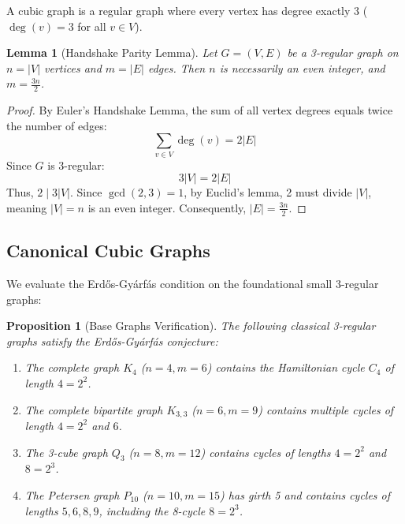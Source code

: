 \documentclass[11pt,a4paper]{article}
\newtheorem{lemma}[theorem]{Lemma}
\newtheorem{proposition}[theorem]{Proposition}
\theoremstyle{definition}
\begin{document}
A cubic graph is a regular graph where every vertex has degree exactly 3 ($\deg(v) = 3$ for all $v \in V$).

\begin{lemma}[Handshake Parity Lemma]\label{lem:handshake}
Let $G = (V, E)$ be a 3-regular graph on $n = |V|$ vertices and $m = |E|$ edges. Then $n$ is necessarily an even integer, and $m = \frac{3n}{2}$.
\end{lemma}

\begin{proof}
By Euler's Handshake Lemma, the sum of all vertex degrees equals twice the number of edges:
\[ \sum_{v \in V} \deg(v) = 2 |E| \]
Since $G$ is 3-regular:
\[ 3 |V| = 2 |E| \]
Thus, $2 \mid 3 |V|$. Since $\gcd(2, 3) = 1$, by Euclid's lemma, 2 must divide $|V|$, meaning $|V| = n$ is an even integer. Consequently, $|E| = \frac{3n}{2}$.
\end{proof}

\subsection{Canonical Cubic Graphs}

We evaluate the Erd\H{o}s-Gy\'arf\'as condition on the foundational small 3-regular graphs:

\begin{proposition}[Base Graphs Verification]\label{prop:base_graphs}
The following classical 3-regular graphs satisfy the Erd\H{o}s-Gy\'arf\'as conjecture:
\begin{enumerate}
    \item The complete graph $K_4$ ($n=4, m=6$) contains the Hamiltonian cycle $C_4$ of length $4 = 2^2$.
    \item The complete bipartite graph $K_{3, 3}$ ($n=6, m=9$) contains multiple cycles of length $4 = 2^2$ and $6$.
    \item The 3-cube graph $Q_3$ ($n=8, m=12$) contains cycles of lengths $4 = 2^2$ and $8 = 2^3$.
    \item The Petersen graph $P_{10}$ ($n=10, m=15$) has girth 5 and contains cycles of lengths $5, 6, 8, 9$, including the 8-cycle $8 = 2^3$.
\end{enumerate}
\end{proposition}
\end{document}

